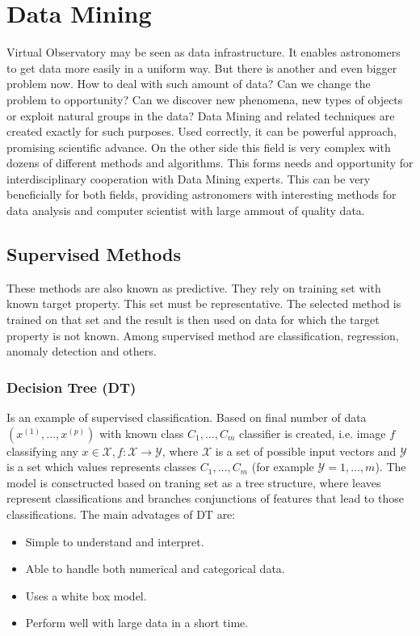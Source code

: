 \chapter{Data Mining}
\label{chap:dataMining}
Virtual Observatory may be seen as data infrastructure. It enables
astronomers to get data more easily in a uniform way. But there is
another and even bigger problem now. How to deal with such amount of
data? Can we change the problem to opportunity? Can we discover new
phenomena, new types of objects or exploit natural groups in the data?
Data Mining and related techniques are created exactly for such
purposes. Used correctly, it can be powerful approach, promising
scientific advance. On the other side this field is very complex with
dozens of different methods and algorithms. This forms needs and
opportunity for interdisciplinary cooperation with Data Mining
experts. This can be very beneficially for both fields, providing
astronomers with interesting methods for data analysis and computer
scientist with large ammout of quality data.

\section{Supervised Methods}
These methods are also known as predictive\cite{ball2010data}. They
rely on training set with known target property. This set must be
representative. The selected method is trained on that set and the
result is then used on data for which the target property is not
known. Among supervised method are classification, regression, anomaly
detection and others.

\subsection{Decision Tree (DT)}
Is an example of supervised classification. Based on final number of
data $(x^{(1)},\ldots,x^{(p)})$ with known class $C_1,\ldots, C_m$
classifier is created, i.e. image $f$ classifying any $x \in
\mathcal{X}, f:\mathcal{X}\rightarrow \mathcal{Y}$, where
$\mathcal{X}$ is a set of possible input vectors and $\mathcal{Y}$ is
a set which values represents classes $C_1,\ldots, C_m$ (for example
$\mathcal{Y} = {1,\ldots,m}$). The model is consctructed based on
traning set as a tree structure, where leaves represent
classifications and branches conjunctions of features that lead to
those classifications. The main advatages of DT are:

\begin{itemize}
\item Simple to understand and interpret.
\item Able to handle both numerical and categorical data.
\item Uses a white box model.
\item Perform well with large data in a short time.
\end{itemize}

